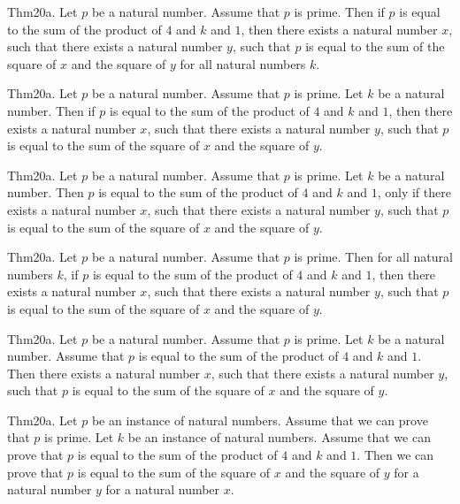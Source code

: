 \documentclass{article}
\begin{document}
Thm20a. Let $p$ be a natural number. Assume that $p$ is prime. Then if $p$ is equal to the sum of the product of $4$ and $k$ and $1$, then there exists a natural number $x$, such that there exists a natural number $y$, such that $p$ is equal to the sum of the square of $x$ and the square of $y$ for all natural numbers $k$.

Thm20a. Let $p$ be a natural number. Assume that $p$ is prime. Let $k$ be a natural number. Then if $p$ is equal to the sum of the product of $4$ and $k$ and $1$, then there exists a natural number $x$, such that there exists a natural number $y$, such that $p$ is equal to the sum of the square of $x$ and the square of $y$.

Thm20a. Let $p$ be a natural number. Assume that $p$ is prime. Let $k$ be a natural number. Then $p$ is equal to the sum of the product of $4$ and $k$ and $1$, only if there exists a natural number $x$, such that there exists a natural number $y$, such that $p$ is equal to the sum of the square of $x$ and the square of $y$.

Thm20a. Let $p$ be a natural number. Assume that $p$ is prime. Then for all natural numbers $k$, if $p$ is equal to the sum of the product of $4$ and $k$ and $1$, then there exists a natural number $x$, such that there exists a natural number $y$, such that $p$ is equal to the sum of the square of $x$ and the square of $y$.

Thm20a. Let $p$ be a natural number. Assume that $p$ is prime. Let $k$ be a natural number. Assume that $p$ is equal to the sum of the product of $4$ and $k$ and $1$. Then there exists a natural number $x$, such that there exists a natural number $y$, such that $p$ is equal to the sum of the square of $x$ and the square of $y$.

Thm20a. Let $p$ be an instance of natural numbers. Assume that we can prove that $p$ is prime. Let $k$ be an instance of natural numbers. Assume that we can prove that $p$ is equal to the sum of the product of $4$ and $k$ and $1$. Then we can prove that $p$ is equal to the sum of the square of $x$ and the square of $y$ for a natural number $y$ for a natural number $x$.
\end{document}
